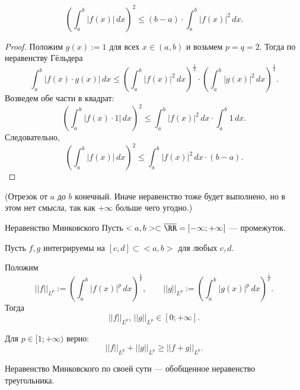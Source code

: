 \begin{Corollary}{}{}
\[
\left(\int_a^b |f(x)|\,dx\right)^2 \le (b-a)\cdot \int_a^b |f(x)|^2\,dx.
\]
\end{Corollary}

\begin{proof}
	Положим $g(x):=1$ для всех $x\in(a,b)$ и возьмем $p=q=2$. Тогда по неравенству Гёльдера
	\[
	\int_a^b |f(x)\cdot g(x)|\,dx
	\le
	\left(\int_a^b |f(x)|^2\,dx\right)^{\frac{1}{2}}
	\cdot
	\left(\int_a^b |g(x)|^2\,dx\right)^{\frac{1}{2}}.
	\]
	Возведем обе части в квадрат:
	\[
	\left(\int_a^b |f(x)\cdot 1|\,dx\right)^2
	\le
	\int_a^b |f(x)|^2\,dx \cdot \int_a^b 1\,dx.
	\]
	Следовательно,
	\[
	\left(\int_a^b |f(x)|\,dx\right)^2
	\le
	\int_a^b |f(x)|^2\,dx \cdot (b-a).
	\]
\end{proof}

(Отрезок от $a$ до $b$ конечный. Иначе неравенство тоже будет выполнено, но в этом нет смысла, так как $+\infty$ больше чего угодно.)

\vspace{3\baselineskip}

\begin{Theorem}{Неравенство Минковского}{}
	Пусть $<a,b>\subset \overline{\RR}=[-\infty;+\infty]$ --- промежуток.
	
	Пусть $f,g$ интегрируемы на $[c,d]\subset<a,b>$ для любых $c,d$.
	
	Положим
	\[
	||f||_{L^p}:=\left(\int_a^b |f(x)|^p\,dx\right)^{\frac{1}{p}},
	\qquad
	||g||_{L^p}:=\left(\int_a^b |g(x)|^p\,dx\right)^{\frac{1}{p}}.
	\]
	Тогда
	\[
	||f||_{L^p},\,||g||_{L^p}\in[0;+\infty].
	\]
	
	Для $p\in[1;+\infty)$ верно:
	\[
	||f||_{L^p}+||g||_{L^p}\ge ||f+g||_{L^p}.
	\]
\end{Theorem}

Неравенство Минковского по своей сути --- обобщенное неравенство треугольника.

